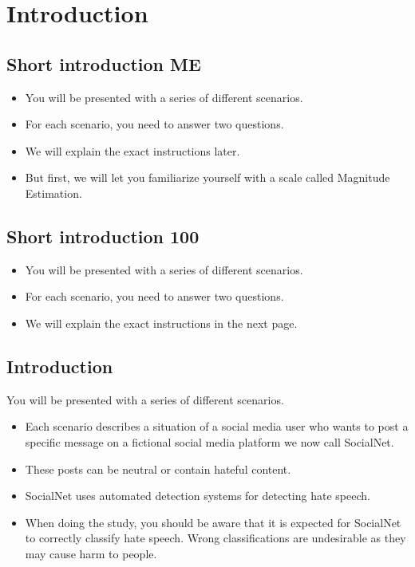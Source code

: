 \section{Introduction}
\subsection{Short introduction ME}
\begin{itemize}
    \item You will be presented with a series of different scenarios.
    \item For each scenario, you need to answer two questions.
    \item We will explain the exact instructions later.
    \item But first, we will let you familiarize yourself with a scale called Magnitude Estimation.
\end{itemize}

\subsection{Short introduction 100}
\begin{itemize}
    \item You will be presented with a series of different scenarios.
    \item For each scenario, you need to answer two questions.
    \item We will explain the exact instructions in the next page.
\end{itemize}


\subsection{Introduction}
You will be presented with a series of different scenarios.
\begin{itemize}
    \item Each scenario describes a situation of a social media user who wants to post a specific message on a fictional social media platform we now call SocialNet.
    \item These posts can be neutral or contain hateful content.
    \item SocialNet uses automated detection systems for detecting hate speech.
    \item When doing the study, you should be aware that it is expected for SocialNet to correctly classify hate speech. Wrong classifications are undesirable as they may cause harm to people.
\end{itemize}

